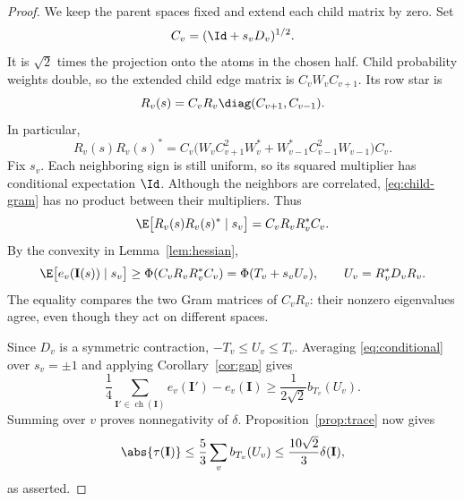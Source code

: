 \begin{proof}
We keep the parent spaces fixed and extend each child matrix by zero.
Set
\[
 C_v=(\Id+s_vD_v)^{1/2}.
\]
It is \(\sqrt2\) times the projection onto the atoms in the chosen
half. Child probability weights double, so the extended child edge
matrix is \(C_vW_vC_{v+1}\). Its row star is
\[
 R_v(s)=C_vR_v\diag(C_{v+1},C_{v-1}).
\]
In particular,
\begin{equation}\label{eq:child-gram}
 R_v(s)R_v(s)^*
 =C_v\bigl(
 W_vC_{v+1}^2W_v^*
 +W_{v-1}^*C_{v-1}^2W_{v-1}
 \bigr)C_v.
\end{equation}
Fix \(s_v\). Each neighboring sign is still uniform, so its squared
multiplier has conditional expectation \(\Id\).
Although the neighbors are correlated, \eqref{eq:child-gram} has
no product between their multipliers. Thus
\[
 \E\bigl[R_v(s)R_v(s)^*\mid s_v\bigr]
       =C_vR_vR_v^*C_v.
\]
By the convexity in Lemma~\ref{lem:hessian},
\begin{equation}\label{eq:conditional}
 \E\bigl[e_v(\mathbf I(s))\mid s_v\bigr]
       \ge\Phi(C_vR_vR_v^*C_v)
       =\Phi(T_v+s_vU_v),
 \qquad U_v=R_v^*D_vR_v.
\end{equation}
The equality compares the two Gram matrices of \(C_vR_v\):
their nonzero eigenvalues agree, even though they act on different
spaces.

Since \(D_v\) is a symmetric contraction, \(-T_v\le U_v\le T_v\).
Averaging \eqref{eq:conditional} over \(s_v=\pm1\) and applying
Corollary~\ref{cor:gap} gives
\[
 \frac14\sum_{\mathbf I'\in\operatorname{ch}(\mathbf I)}
                     e_v(\mathbf I')-e_v(\mathbf I)
       \ge\frac{1}{2\sqrt2}b_{T_v}(U_v).
\]
Summing over \(v\) proves nonnegativity of \(\delta\).
Proposition~\ref{prop:trace} now gives
\[
 \abs{\tau(\mathbf I)}
 \le\frac53\sum_v b_{T_v}(U_v)
 \le\frac{10\sqrt2}{3}\delta(\mathbf I),
\]
as asserted.
\end{proof}
